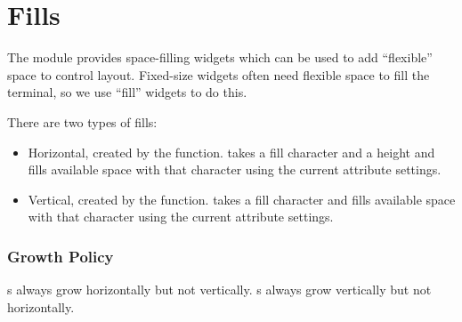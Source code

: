 \section{Fills}

The  module provides space-filling widgets which can be used
to add ``flexible'' space to control layout.  Fixed-size widgets often
need flexible space to fill the terminal, so we use ``fill'' widgets
to do this.

There are two types of fills:

\begin{itemize}
\item Horizontal, created by the  function.  
  takes a fill character and a height and fills available space with
  that character using the current attribute settings.
\item Vertical, created by the  function.   takes
  a fill character and fills available space with that character using
  the current attribute settings.
\end{itemize}

\subsubsection{Growth Policy}

s always grow horizontally but not vertically.  s
always grow vertically but not horizontally.
